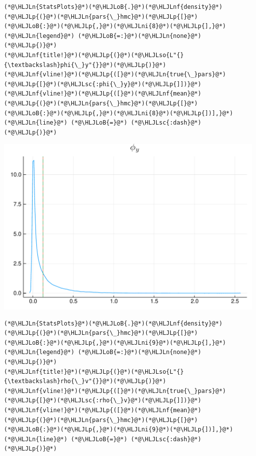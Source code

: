 \documentclass[12pt,a4paper]{article}
\newcommand{\HLJLn}[1]{#1}
\newcommand{\HLJLnf}[1]{\textcolor[RGB]{66,102,213}{#1}}
\newcommand{\HLJLsc}[1]{\textcolor[RGB]{201,61,57}{#1}}
\newcommand{\HLJLso}[1]{\textcolor[RGB]{201,61,57}{#1}}
\newcommand{\HLJLni}[1]{\textcolor[RGB]{59,151,46}{#1}}
\newcommand{\HLJLoB}[1]{\textcolor[RGB]{102,102,102}{\textbf{#1}}}
\newcommand{\HLJLp}[1]{#1}
\begin{document}
\begin{lstlisting}
(*@\HLJLn{StatsPlots}@*)(*@\HLJLoB{.}@*)(*@\HLJLnf{density}@*)(*@\HLJLp{(}@*)(*@\HLJLn{pars{\_}hmc}@*)(*@\HLJLp{[}@*)(*@\HLJLoB{:}@*)(*@\HLJLp{,}@*)(*@\HLJLni{8}@*)(*@\HLJLp{],}@*) (*@\HLJLn{legend}@*) (*@\HLJLoB{=:}@*)(*@\HLJLn{none}@*)(*@\HLJLp{)}@*)
(*@\HLJLnf{title!}@*)(*@\HLJLp{(}@*)(*@\HLJLso{L"{}{\textbackslash}phi{\_}y"{}}@*)(*@\HLJLp{)}@*)
(*@\HLJLnf{vline!}@*)(*@\HLJLp{([}@*)(*@\HLJLn{true{\_}pars}@*)(*@\HLJLp{[}@*)(*@\HLJLsc{:phi{\_}y}@*)(*@\HLJLp{]])}@*)
(*@\HLJLnf{vline!}@*)(*@\HLJLp{([}@*)(*@\HLJLnf{mean}@*)(*@\HLJLp{(}@*)(*@\HLJLn{pars{\_}hmc}@*)(*@\HLJLp{[}@*)(*@\HLJLoB{:}@*)(*@\HLJLp{,}@*)(*@\HLJLni{8}@*)(*@\HLJLp{])],}@*) (*@\HLJLn{line}@*) (*@\HLJLoB{=}@*) (*@\HLJLsc{:dash}@*)(*@\HLJLp{)}@*)
\end{lstlisting}

\includegraphics[width=\linewidth]{figures/dsge_and_julia_42_1.pdf}

\begin{lstlisting}
(*@\HLJLn{StatsPlots}@*)(*@\HLJLoB{.}@*)(*@\HLJLnf{density}@*)(*@\HLJLp{(}@*)(*@\HLJLn{pars{\_}hmc}@*)(*@\HLJLp{[}@*)(*@\HLJLoB{:}@*)(*@\HLJLp{,}@*)(*@\HLJLni{9}@*)(*@\HLJLp{],}@*) (*@\HLJLn{legend}@*) (*@\HLJLoB{=:}@*)(*@\HLJLn{none}@*)(*@\HLJLp{)}@*)
(*@\HLJLnf{title!}@*)(*@\HLJLp{(}@*)(*@\HLJLso{L"{}{\textbackslash}rho{\_}v"{}}@*)(*@\HLJLp{)}@*)
(*@\HLJLnf{vline!}@*)(*@\HLJLp{([}@*)(*@\HLJLn{true{\_}pars}@*)(*@\HLJLp{[}@*)(*@\HLJLsc{:rho{\_}v}@*)(*@\HLJLp{]])}@*)
(*@\HLJLnf{vline!}@*)(*@\HLJLp{([}@*)(*@\HLJLnf{mean}@*)(*@\HLJLp{(}@*)(*@\HLJLn{pars{\_}hmc}@*)(*@\HLJLp{[}@*)(*@\HLJLoB{:}@*)(*@\HLJLp{,}@*)(*@\HLJLni{9}@*)(*@\HLJLp{])],}@*) (*@\HLJLn{line}@*) (*@\HLJLoB{=}@*) (*@\HLJLsc{:dash}@*)(*@\HLJLp{)}@*)
\end{lstlisting}
\end{document}
